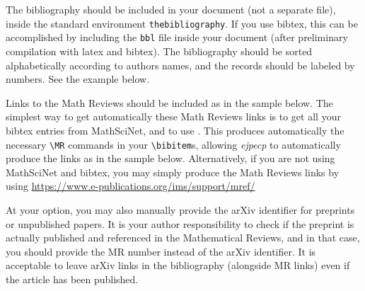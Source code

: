 \documentclass[ECP]{ejpecp} %
\begin{document}
The bibliography should be included in your document (not a separate file),
inside the standard environment \verb+thebibliography+. If you use bibtex,
this can be accomplished by including the \texttt{bbl} file inside your
document (after preliminary compilation with latex and bibtex). The
bibliography should be sorted alphabetically according to authors names, and
the records should be labeled by numbers. See the example below.

Links to the Math Reviews should be included as in the sample below. The
simplest way to get automatically these Math Reviews links is to get all your
bibtex entries from MathSciNet, and to use
\verb++. This produces automatically the necessary
\verb+\MR+ commands in your \verb+\bibitem+s, allowing \emph{ejpecp} to
automatically produce the links as in the sample below. Alternatively, if you
are not using MathSciNet and bibtex, you may simply produce the Math Reviews
links by using
\url{https://www.e-publications.org/ims/support/mref/}

At your option, you may also manually provide the arXiv identifier for
preprints or unpublished papers. It is your author responsibility to check if
the preprint is actually published and referenced in the Mathematical Reviews,
and in that case, you should provide the MR number instead of the arXiv
identifier. It is acceptable to leave arXiv links in the bibliography
(alongside MR links) even if the article has been published.


\begin{supplement}
\end{supplement}
\begin{supplement}
\end{supplement}

\end{document}
